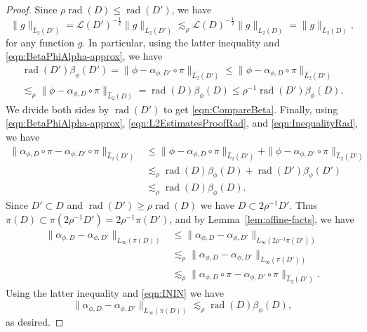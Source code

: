 \documentclass[12pt,reqno]{amsart}
\newcommand{\cL}{\mathcal{L}}
\DeclareMathOperator{\rad}{rad}
\theoremstyle{remark}
\newcommand{\0}{\mathbf{0}}
\renewcommand{\1}{\mathbf 1}
\begin{document}
\begin{proof}
  Since $\rho\rad(D)\leq \rad(D')$, we have
  \begin{equation}\label{eqn:L2EstimatesProofRad}
  \|g\|_{\widehat{L}_2(D')} = \cL(D')^{-\frac{1}{2}} \|g\|_{L_2(D')} \lesssim_{\rho} \cL(D)^{-\frac{1}{2}} \|g\|_{L_2(D)} = \|g\|_{\widehat{L}_2(D)},
  \end{equation}
  for any function $g$. In particular, using the latter inequality and \eqref{eqn:BetaPhiAlpha-approx}, we have
  \begin{multline}\label{eqn:InequalityRad}
  \rad(D')\beta_\phi(D') = \|\phi-\alpha_{\phi,D'}\circ \pi\|_{\widehat{L}_2(D')} 
  \leq \|\phi-\alpha_{\phi,D}\circ \pi\|_{\widehat{L}_2(D')}  \\
  \lesssim_{\rho} \|\phi-\alpha_{\phi,D}\circ \pi\|_{\widehat{L}_2(D)} 
  =\rad(D)\beta_\phi(D) \le \rho^{-1} \rad(D')\beta_\phi(D).
  \end{multline}
  We divide both sides by $\rad(D')$ to get \eqref{eqn:CompareBeta}.
    Finally, using \eqref{eqn:BetaPhiAlpha-approx}, \eqref{eqn:L2EstimatesProofRad}, and \eqref{eqn:InequalityRad}, we have
  \begin{equation}\label{eqn:ININ}
  \begin{aligned}
      \|\alpha_{\phi,D}\circ \pi - \alpha_{\phi,D'}\circ \pi\|_{\widehat{L}_2(D')} &\le \|\phi-\alpha_{\phi,D}\circ \pi\|_{\widehat{L}_2(D')}
      + \|\phi-\alpha_{\phi,D'}\circ \pi\|_{\widehat{L}_2(D')} \\
      &\lesssim_{\rho} \rad(D)\beta_\phi(D) + \rad(D')\beta_\phi(D')\\
      &\lesssim_{\rho} \rad(D)\beta_\phi(D).
      \end{aligned}
  \end{equation}
  Since $D'\subset D$ and $\rad(D')\geq\rho\rad(D)$ we have $D\subset 2\rho^{-1}D'$. Thus $\pi(D)\subset \pi(2\rho^{-1}D')=2\rho^{-1}\pi(D')$, and by Lemma~\ref{lem:affine-facts}, we have
  \[
  \begin{aligned}
  \|\alpha_{\phi,D} - \alpha_{\phi,D'}\|_{L_\infty(\pi(D))} &\le
    \|\alpha_{\phi,D} - \alpha_{\phi,D'}\|_{L_\infty(2\rho^{-1}\pi(D'))}\\
  &\lesssim_{\rho}
  \|\alpha_{\phi,D} - \alpha_{\phi,D'}\|_{L_\infty(\pi(D'))}  \\
  &\lesssim_{\rho} \|\alpha_{\phi,D}\circ \pi - \alpha_{\phi,D'}\circ \pi\|_{\widehat{L}_2(D')}.
  \end{aligned}
  \]
  Using the latter inequality and \eqref{eqn:ININ} we have
  \[
    \|\alpha_{\phi,D} - \alpha_{\phi,D'}\|_{L_\infty(\pi(D))} \lesssim_{\rho} \rad(D)\beta_\phi(D),
  \]
  as desired.
\end{proof}
\end{document}
